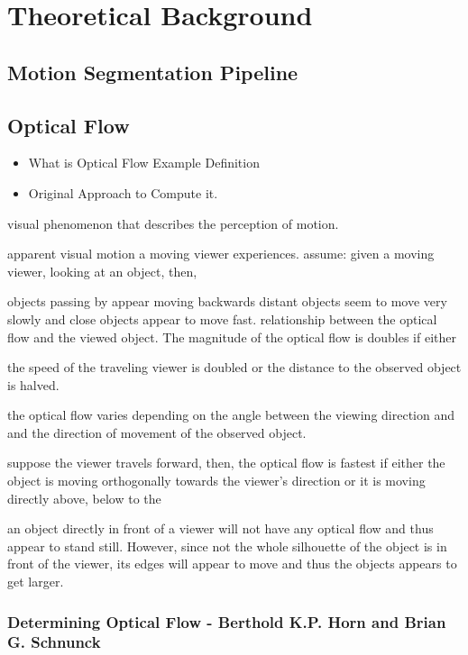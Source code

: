 \chapter{Theoretical Background}


\section{Motion Segmentation Pipeline}

\section{Optical Flow}
\begin{itemize}
  \item What is Optical Flow
  \subitem Example
  \subitem Definition
  \item Original Approach to Compute it.
\end{itemize}


visual phenomenon that describes the perception of motion.

apparent visual motion a moving viewer experiences.
assume: given a moving viewer, looking at an object, then, 

objects passing by appear moving backwards
distant objects seem to move very slowly and close objects appear to move fast.
relationship between the optical flow and the viewed object. The magnitude of the optical flow is doubles if either

the speed of the traveling viewer is doubled or the distance to the observed object is halved.

the optical flow varies depending on the angle between the viewing direction and and the direction of movement of the observed object.

suppose the viewer travels forward, then, the optical flow is fastest if either the object is moving orthogonally towards the viewer's direction or it is moving directly above, below to the 

an object directly in front of a viewer will not have any optical flow and thus appear to stand still. However, since not the whole silhouette of the object is in front of the viewer, its edges will appear to move and thus the objects appears to get larger. 
 

\subsection{Determining Optical Flow - Berthold K.P. Horn and Brian G. Schnunck}


